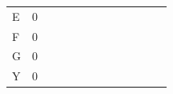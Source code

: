 \documentclass{bredelebeamer}
\begin{document}
\begin{frame}
\begin{table}[]
\begin{tabular}{lllllllllllll}
\multicolumn{1}{l|}{E}  & \multicolumn{1}{l|}{0} & \multicolumn{1}{l|}{}  & \multicolumn{1}{l|}{}  & \multicolumn{1}{l|}{}  & \multicolumn{1}{l|}{}  & \multicolumn{1}{l|}{}  & \multicolumn{1}{l|}{}  & \multicolumn{1}{l|}{}  & \multicolumn{1}{l|}{}  & \multicolumn{1}{l|}{}  & \multicolumn{1}{l|}{}  & \multicolumn{1}{l|}{}  \\ \cline{2-13} 
\multicolumn{1}{l|}{F}  & \multicolumn{1}{l|}{0} & \multicolumn{1}{l|}{}  & \multicolumn{1}{l|}{}  & \multicolumn{1}{l|}{}  & \multicolumn{1}{l|}{}  & \multicolumn{1}{l|}{}  & \multicolumn{1}{l|}{}  & \multicolumn{1}{l|}{}  & \multicolumn{1}{l|}{}  & \multicolumn{1}{l|}{}  & \multicolumn{1}{l|}{}  & \multicolumn{1}{l|}{}  \\ \cline{2-13} 
\multicolumn{1}{l|}{G}  & \multicolumn{1}{l|}{0} & \multicolumn{1}{l|}{}  & \multicolumn{1}{l|}{}  & \multicolumn{1}{l|}{}  & \multicolumn{1}{l|}{}  & \multicolumn{1}{l|}{}  & \multicolumn{1}{l|}{}  & \multicolumn{1}{l|}{}  & \multicolumn{1}{l|}{}  & \multicolumn{1}{l|}{}  & \multicolumn{1}{l|}{}  & \multicolumn{1}{l|}{}  \\ \cline{2-13} 
\multicolumn{1}{l|}{Y}  & \multicolumn{1}{l|}{0} & \multicolumn{1}{l|}{}  & \multicolumn{1}{l|}{}  & \multicolumn{1}{l|}{}  & \multicolumn{1}{l|}{}  & \multicolumn{1}{l|}{}  & \multicolumn{1}{l|}{}  & \multicolumn{1}{l|}{}  & \multicolumn{1}{l|}{}  & \multicolumn{1}{l|}{}  & \multicolumn{1}{l|}{}  & \multicolumn{1}{l|}{}  \\ \cline{2-13} 
\end{tabular}
\end{table}
     
 \end{frame}
 
\end{document}
